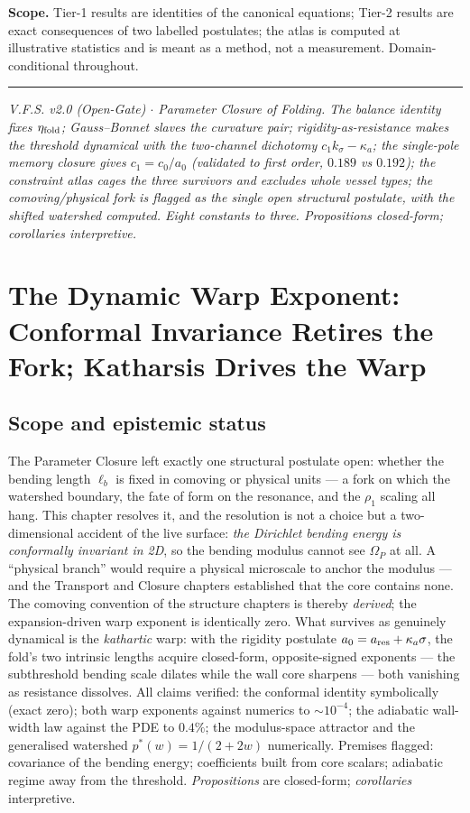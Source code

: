 \documentclass[11pt,a4paper,oneside]{book}
\newcommand{\Op}{\Omega_P}
\newcommand{\lb}{\ell_b}
\newcommand{\etaf}{\eta_{\rm fold}}
\theoremstyle{plain}
\theoremstyle{definition}
\theoremstyle{remark}
\begin{document}
\textbf{Scope.} Tier-1 results are identities of the canonical equations; Tier-2 results are exact
consequences of two labelled postulates; the atlas is computed at illustrative statistics and is
meant as a method, not a measurement. Domain-conditional throughout.

\vspace{0.5em}
\hrule
\smallskip
\noindent\footnotesize\emph{V.F.S. v2.0 (Open-Gate) $\cdot$ Parameter Closure of Folding. The
balance identity fixes $\etaf$; Gauss--Bonnet slaves the curvature pair; rigidity-as-resistance
makes the threshold dynamical with the two-channel dichotomy $c_1k_\sigma-\kappa_a$; the single-pole
memory closure gives $c_1=c_0/a_0$ (validated to first order, $0.189$ vs $0.192$); the constraint
atlas cages the three survivors and excludes whole vessel types; the comoving/physical fork is
flagged as the single open structural postulate, with the shifted watershed computed. Eight
constants to three. Propositions closed-form; corollaries interpretive.}

\chapter{The Dynamic Warp Exponent: Conformal Invariance Retires the Fork; Katharsis Drives the Warp}

\section*{Scope and epistemic status}
The Parameter Closure left exactly one structural postulate open: whether the bending length $\lb$ is
fixed in comoving or physical units --- a fork on which the watershed boundary, the fate of form on the
resonance, and the $\rho_1$ scaling all hang. This chapter resolves it, and the resolution is not a
choice but a two-dimensional accident of the live surface: \emph{the Dirichlet bending energy is
conformally invariant in 2D}, so the bending modulus cannot see $\Op$ at all. A ``physical branch''
would require a physical microscale to anchor the modulus --- and the Transport and Closure chapters
established that the core contains none. The comoving convention of the structure chapters is thereby
\emph{derived}; the expansion-driven warp exponent is identically zero. What survives as genuinely
dynamical is the \emph{kathartic} warp: with the rigidity postulate $a_0=a_{\rm res}+\kappa_a\sigma$,
the fold's two intrinsic lengths acquire closed-form, opposite-signed exponents --- the subthreshold
bending scale dilates while the wall core sharpens --- both vanishing as resistance dissolves. All
claims verified: the conformal identity symbolically (exact zero); both warp exponents against numerics
to $\sim10^{-4}$; the adiabatic wall-width law against the PDE to $0.4\%$; the modulus-space attractor
and the generalised watershed $p^*(w)=1/(2+2w)$ numerically. Premises flagged: covariance of the
bending energy; coefficients built from core scalars; adiabatic regime away from the threshold.
\emph{Propositions} are closed-form; \emph{corollaries} interpretive.
\end{document}

